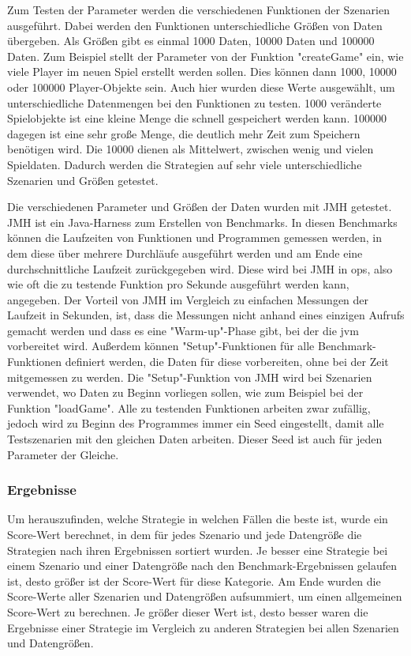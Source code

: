 Zum Testen der Parameter werden die verschiedenen Funktionen der Szenarien ausgeführt. Dabei werden den Funktionen unterschiedliche Größen von Daten übergeben. Als Größen gibt es einmal 1000 Daten, 10000 Daten und 100000 Daten. Zum Beispiel stellt der Parameter von der Funktion "createGame" ein, wie viele Player im neuen Spiel erstellt werden sollen. Dies können dann 1000, 10000 oder 100000 Player-Objekte sein. Auch hier wurden diese Werte ausgewählt, um unterschiedliche Datenmengen bei den Funktionen zu testen. 1000 veränderte Spielobjekte ist eine kleine Menge die schnell gespeichert werden kann. 100000 dagegen ist eine sehr große Menge, die deutlich mehr Zeit zum Speichern benötigen wird. Die 10000 dienen als Mittelwert, zwischen wenig und vielen Spieldaten. Dadurch werden die Strategien auf sehr viele unterschiedliche Szenarien und Größen getestet.

Die verschiedenen Parameter und Größen der Daten wurden mit JMH getestet.\cite{githubGitHubOpenjdkjmh} JMH ist ein Java-Harness zum Erstellen von Benchmarks. In diesen Benchmarks können die Laufzeiten von Funktionen und Programmen gemessen werden, in dem diese über mehrere Durchläufe ausgeführt werden und am Ende eine durchschnittliche Laufzeit zurückgegeben wird. Diese wird bei JMH in \ac{ops}, also wie oft die zu testende Funktion pro Sekunde ausgeführt werden kann, angegeben.\cite{githubGitHubOpenjdkjmh} Der Vorteil von JMH im Vergleich zu einfachen Messungen der Laufzeit in Sekunden, ist, dass die Messungen nicht anhand eines einzigen Aufrufs gemacht werden und dass es eine "Warm-up"-Phase gibt, bei der die \ac{jvm} vorbereitet wird. Außerdem können "Setup"-Funktionen für alle Benchmark-Funktionen definiert werden, die Daten für diese vorbereiten, ohne bei der Zeit mitgemessen zu werden. Die "Setup"-Funktion von JMH wird bei Szenarien verwendet, wo Daten zu Beginn vorliegen sollen, wie zum Beispiel bei der Funktion "loadGame". Alle zu testenden Funktionen arbeiten zwar zufällig, jedoch wird zu Beginn des Programmes immer ein Seed eingestellt, damit alle Testszenarien mit den gleichen Daten arbeiten. Dieser Seed ist auch für jeden Parameter der Gleiche.

\subsubsection{Ergebnisse}
Um herauszufinden, welche Strategie in welchen Fällen die beste ist, wurde ein Score-Wert berechnet, in dem für jedes Szenario und jede Datengröße die Strategien nach ihren Ergebnissen sortiert wurden. Je besser eine Strategie bei einem Szenario und einer Datengröße nach den Benchmark-Ergebnissen gelaufen ist, desto größer ist der Score-Wert für diese Kategorie. Am Ende wurden die Score-Werte aller Szenarien und Datengrößen aufsummiert, um einen allgemeinen Score-Wert zu berechnen. Je größer dieser Wert ist, desto besser waren die Ergebnisse einer Strategie im Vergleich zu anderen Strategien bei allen Szenarien und Datengrößen. 


